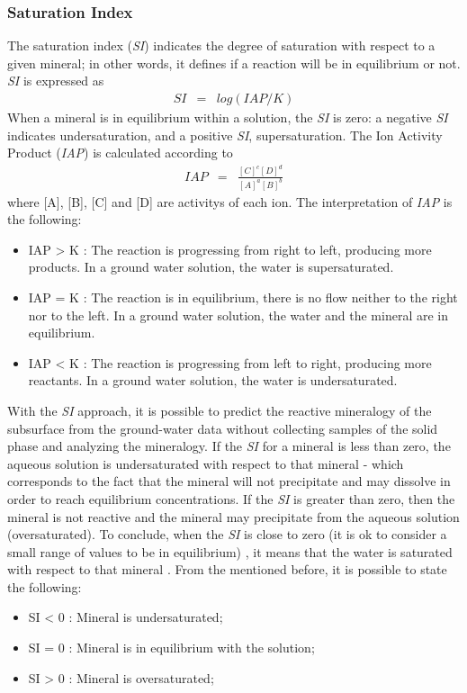 \documentclass[ppgc,mestrado,English]{iiufrgs}
\begin{document}
\subsubsection{Saturation Index}
The saturation index (\emph{SI}) indicates the degree of saturation with respect to a given mineral; in other words, it defines if a reaction will be in equilibrium or not. \emph{SI} is expressed as
\begin{eqnarray} \label{eq:siEq}
SI &=& log (IAP / K )
\end{eqnarray}
When a mineral is in equilibrium within a solution, the \emph{SI} is zero: a negative \emph{SI} indicates undersaturation, and a positive \emph{SI}, supersaturation. 
The Ion Activity Product (\emph{IAP}) is calculated according to
\begin{eqnarray}
IAP &=& \frac{[C]^c [D]^d}{[A]^a[B]^b}
\end{eqnarray}
where [A], [B], [C] and [D] are activitys of each ion. The interpretation of \emph{IAP} is the following:
\begin{itemize}
\item IAP > K : The reaction is progressing from right to left, producing more products. In a ground water solution, the water is supersaturated.
\item IAP = K : The reaction is in equilibrium, there is no flow neither to the right nor to the left. In a ground water solution, the water and the mineral are in equilibrium.
\item IAP < K : The reaction is progressing from left to right, producing more reactants. In a ground water solution, the water is undersaturated.
\end{itemize}

With the \emph{SI} approach, it is possible to predict the reactive mineralogy of the subsurface from the ground-water data without collecting samples of the solid phase and analyzing the mineralogy. If the \emph{SI} for a mineral is less than zero, the aqueous solution is undersaturated with respect to that mineral - which corresponds to the fact that the mineral will not precipitate and may dissolve in order to reach equilibrium concentrations. If the \emph{SI} is greater than zero, then the mineral is not reactive and the mineral may precipitate from the aqueous solution (oversaturated). To conclude, when the \emph{SI} is close to zero (it is ok to consider a small range of values to be in equilibrium) , it means that the water is saturated  with respect to that mineral \cite{Alley:93}. From the mentioned before, it is possible to state the following:
\begin{itemize}
\item SI < 0 : Mineral is undersaturated;
\item SI = 0 : Mineral is in equilibrium with the solution;
\item SI > 0 : Mineral is oversaturated;
\end{itemize}
\end{document}
